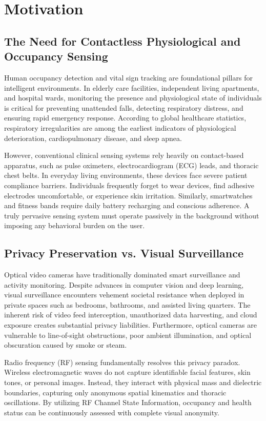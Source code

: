 \chapter{Motivation}
\label{chap:motivation}

\section{The Need for Contactless Physiological and Occupancy Sensing}
Human occupancy detection and vital sign tracking are foundational pillars for intelligent environments. In elderly care facilities, independent living apartments, and hospital wards, monitoring the presence and physiological state of individuals is critical for preventing unattended falls, detecting respiratory distress, and ensuring rapid emergency response. According to global healthcare statistics, respiratory irregularities are among the earliest indicators of physiological deterioration, cardiopulmonary disease, and sleep apnea. 

However, conventional clinical sensing systems rely heavily on contact-based apparatus, such as pulse oximeters, electrocardiogram (ECG) leads, and thoracic chest belts. In everyday living environments, these devices face severe patient compliance barriers. Individuals frequently forget to wear devices, find adhesive electrodes uncomfortable, or experience skin irritation. Similarly, smartwatches and fitness bands require daily battery recharging and conscious adherence. A truly pervasive sensing system must operate passively in the background without imposing any behavioral burden on the user.

\section{Privacy Preservation vs. Visual Surveillance}
Optical video cameras have traditionally dominated smart surveillance and activity monitoring. Despite advances in computer vision and deep learning, visual surveillance encounters vehement societal resistance when deployed in private spaces such as bedrooms, bathrooms, and assisted living quarters. The inherent risk of video feed interception, unauthorized data harvesting, and cloud exposure creates substantial privacy liabilities. Furthermore, optical cameras are vulnerable to line-of-sight obstructions, poor ambient illumination, and optical obscuration caused by smoke or steam.

Radio frequency (RF) sensing fundamentally resolves this privacy paradox. Wireless electromagnetic waves do not capture identifiable facial features, skin tones, or personal images. Instead, they interact with physical mass and dielectric boundaries, capturing only anonymous spatial kinematics and thoracic oscillations. By utilizing RF Channel State Information, occupancy and health status can be continuously assessed with complete visual anonymity.

